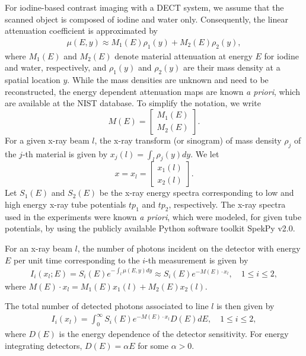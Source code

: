 \documentclass[12pt,twoside]{article}   %
\begin{document}
For iodine-based contrast imaging with a DECT system, we assume that the scanned object is composed of iodine and water only. Consequently, the linear attenuation coefficient is approximated by\cite{AlvarezMacovski}
\begin{align}
    \mu(E,y) \approx M_1(E)\rho_1(y)+M_2(E)\rho_2(y),
\end{align}
where $M_1(E)$ and $M_2(E)$ denote material attenuation at energy $E$ for iodine and water, respectively, and $\rho_1(y)$ and $\rho_2(y)$ are their mass density at a spatial location $y$. While the mass densities are unknown and need to be reconstructed, the energy dependent attenuation maps are known \emph{a priori}, which are available at the NIST database\cite{NIST}. To simplify the notation, we write
\[
M(E) =
\begin{bmatrix}
M_1(E)\\
M_2(E)
\end{bmatrix}.
\]
For a given x-ray beam $l$, the x-ray transform (or sinogram) of mass density $\rho_j$ of the $j$-th material is given by $x_j(l)=\textstyle \int_{l} \rho_j(y)dy$. We let 
\[
x=x_l =
\begin{bmatrix}
x_1(l)\\
x_2(l)
\end{bmatrix}.
\]
Let $S_1(E)$ and $S_2(E)$ be the x-ray energy spectra corresponding to low and high energy x-ray tube potentials $tp_1$ and $tp_2$, respectively. The x-ray spectra used in the experiments were known \emph{a priori}, which were modeled, for given tube potentials, by using the publicly available Python software toolkit SpekPy v2.0\cite{Spekpy2}.

For an x-ray beam $l$, the number of photons incident on the detector with energy $E$ per unit time corresponding to the $i$-th measurement is given by
\begin{align}\label{eq:IiE}
     I_i(x_l;E) =  S_i(E)e^{-\int_l \mu(E,y)dy} \approx  S_i(E) e^{-M(E) \cdot x_l}, \quad 1\leq i\leq 2,
\end{align}
where $M(E) \cdot x_l = M_1(E)x_1(l)+M_2(E)x_2(l)$.

 The total number of detected photons associated to line $l$ is then given by
\begin{align}\label{eq:Ii}
  I_i(x_l) = \int_0^\infty S_i(E) e^{-M(E) \cdot x_l} D(E) dE, \quad 1\leq i\leq 2,
\end{align}
where $D(E)$ is the energy dependence of the detector sensitivity. For energy integrating detectors, $D(E)=\alpha E$ for some $\alpha>0$. \cite{Whiting2002}
\end{document}
